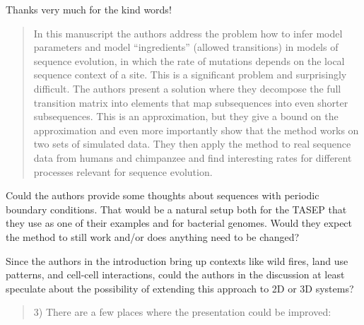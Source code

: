 Thanks very much for the kind words!



\begin{quote}
In this manuscript the authors address the problem how to infer model
parameters and model ``ingredients'' (allowed transitions) in models of
sequence evolution, in which the rate of mutations depends on the
local sequence context of a site. This is a significant problem and
surprisingly difficult. The authors present a solution where they
decompose the full transition matrix into elements that map
subsequences into even shorter subsequences. This is an approximation,
but they give a bound on the approximation and even more importantly
show that the method works on two sets of simulated data. They then
apply the method to real sequence data from humans and chimpanzee and
find interesting rates for different processes relevant for sequence
evolution.
\end{quote}


\begin{point}{}
Could the authors provide some thoughts about sequences with
periodic boundary conditions. That would be a natural setup both for
the TASEP that they use as one of their examples and for bacterial
genomes. Would they expect the method to still work and/or does
anything need to be changed?
\end{point}


\begin{point}{}
Since the authors in the introduction bring up contexts like wild
fires, land use patterns, and cell-cell interactions, could the
authors in the discussion at least speculate about the possibility of
extending this approach to 2D or 3D systems?
\end{point}


\begin{quote}
3) There are a few places where the presentation could be improved:
\end{quote}

